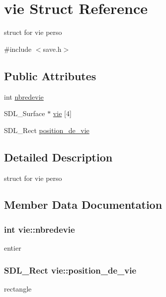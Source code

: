 \hypertarget{structvie}{}\section{vie Struct Reference}
\label{structvie}


struct for vie perso  




{\ttfamily \#include $<$save.\+h$>$}

\subsection*{Public Attributes}
\begin{DoxyCompactItemize}
\item 
int \hyperlink{structvie_ace0f84a19ce4f5854ec56c137b33b947}{nbredevie}
\item 
S\+D\+L\+\_\+\+Surface $\ast$ \hyperlink{structvie_a2c29f60898de16e1306bd1043fa38dc9}{vie} \mbox{[}4\mbox{]}
\item 
S\+D\+L\+\_\+\+Rect \hyperlink{structvie_aaa37f269f7261984f2e540534210af5a}{position\+\_\+de\+\_\+vie}
\end{DoxyCompactItemize}


\subsection{Detailed Description}
struct for vie perso 

\subsection{Member Data Documentation}
\subsubsection[{\texorpdfstring{nbredevie}{nbredevie}}]{\setlength{\rightskip}{0pt plus 5cm}int vie\+::nbredevie}\hypertarget{structvie_ace0f84a19ce4f5854ec56c137b33b947}{}\label{structvie_ace0f84a19ce4f5854ec56c137b33b947}
entier 
\subsubsection[{\texorpdfstring{position\+\_\+de\+\_\+vie}{position_de_vie}}]{\setlength{\rightskip}{0pt plus 5cm}S\+D\+L\+\_\+\+Rect vie\+::position\+\_\+de\+\_\+vie}\hypertarget{structvie_aaa37f269f7261984f2e540534210af5a}{}\label{structvie_aaa37f269f7261984f2e540534210af5a}
rectangle 
